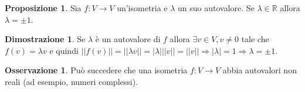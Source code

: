 \documentclass[a4paper]{article}
\theoremstyle{definition}
\newtheorem*{oss}{Osservazione}
\newtheorem*{dimm}{Dimostrazione}
\newtheorem*{prop}{Proposizione}
\begin{document}
	\begin{prop}
		Sia $f: V \to V$ un'isometria e $\lambda$ un suo autovalore. Se $\lambda \in \mathbb{R}$ allora $\lambda = \pm 1$.
	\end{prop}
	\begin{dimm}
		Se $\lambda$ è un autovalore di $f$ allora $\exists v \in V, v \ne 0$ tale che $f(v) = \lambda v$ e quindi
		$||f(v)|| = ||\lambda v|| = |\lambda|||v|| = ||v|| \Rightarrow |\lambda| = 1 \Rightarrow \lambda = \pm 1$.
	\end{dimm}

	\begin{oss}
		Può succedere che una isometria $f: V \to V$ abbia autovalori non reali (ad esempio, numeri complessi).
	\end{oss}
\end{document}
